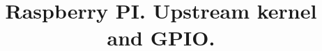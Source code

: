 \documentclass[12pt,a4paper,oneside]{article}
\title{Raspberry PI. Upstream kernel and GPIO.}
\begin{document}
  \sloppy
  \maketitle
  \tableofcontents
  \clearpage

  
  
  
  
  
\end{document}
